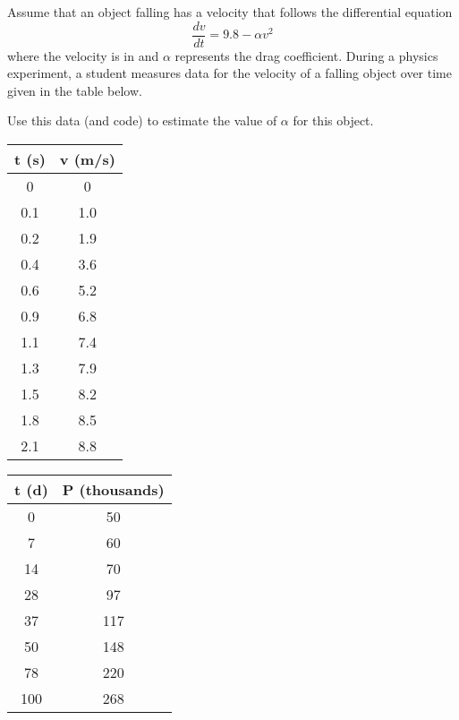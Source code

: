 \begin{exercise}\label{ex:ModelingParamVel}\ansMark%
Assume that an object falling has a velocity that follows the differential equation 
\begin{equation*}
\frac{dv}{dt} = 9.8 - \alpha v^2
\end{equation*}
where the velocity is in  and $\alpha$ represents the drag coefficient. During a physics experiment, a student measures data for the velocity of a falling object over time given in the table below.

Use this data (and code) to estimate the value of $\alpha$ for this object. 
\end{exercise} 
\begin{minipage}{0.49\textwidth}
\centering
    \begin{tabular}{|c|c|}\hline
         \textbf{t} (s)& \textbf{v} (m/s)  \\ \hline
        0 & 0 \\
	0.1 &1.0 \\
	0.2 &  1.9\\
	0.4 & 3.6 \\
	0.6 & 5.2 \\
	0.9 & 6.8 \\
	1.1 & 7.4 \\
	1.3 & 7.9 \\
	1.5 & 8.2 \\
	1.8 & 8.5\\
	2.1 & 8.8  \\ \hline
    \end{tabular}
\end{minipage}%
\begin{minipage}{0.49\textwidth}
    \centering
    \begin{tabular}{|c|c|}\hline
         \textbf{t} (d)& \textbf{P} (thousands)  \\ \hline
        0 & 50 \\
       7  & 60 \\
        14 & 70 \\
        28 & 97 \\
        37 & 117 \\
         50 & 148 \\
        78 & 220 \\
        100 & 268
         \\ \hline
    \end{tabular}
\end{minipage}

